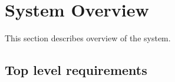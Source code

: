 \chapter{System Overview 
\label{chap:sys_overview}}

This section describes overview of the system.

\section{Top level requirements} 

